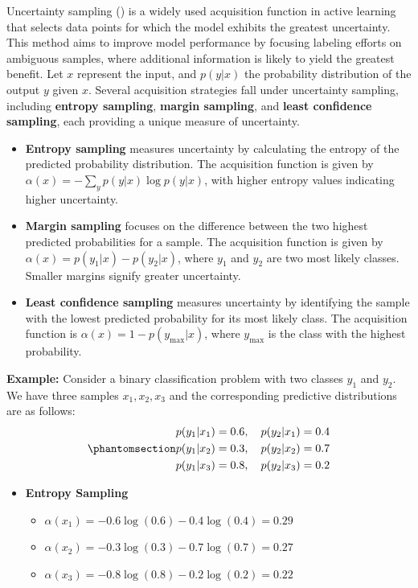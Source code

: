 \documentclass[
  letterpaper,
  numbers=noenddot,
  DIV=11]{scrreprt}
\providecommand{\tightlist}{%
  \setlength{\itemsep}{0pt}\setlength{\parskip}{0pt}}\usepackage{longtable,booktabs,array}
\theoremstyle{definition}
\theoremstyle{plain}
\theoremstyle{plain}
\theoremstyle{remark}
\begin{document}
Uncertainty sampling () is
a widely used acquisition function in active learning that selects data
points for which the model exhibits the greatest uncertainty. This
method aims to improve model performance by focusing labeling efforts on
ambiguous samples, where additional information is likely to yield the
greatest benefit. Let \(x\) represent the input, and \(p(y|x)\) the
probability distribution of the output \(y\) given \(x\). Several
acquisition strategies fall under uncertainty sampling, including
\textbf{entropy sampling}, \textbf{margin sampling}, and \textbf{least
confidence sampling}, each providing a unique measure of uncertainty.

\begin{itemize}
\item
  \textbf{Entropy sampling} measures uncertainty by calculating the
  entropy of the predicted probability distribution. The acquisition
  function is given by \(\alpha(x) = - \sum_{y} p(y|x) \log p(y|x)\),
  with higher entropy values indicating higher uncertainty.
\item
  \textbf{Margin sampling} focuses on the difference between the two
  highest predicted probabilities for a sample. The acquisition function
  is given by \(\alpha(x) = p(y_1|x) - p(y_2|x)\), where \(y_1\) and
  \(y_2\) are two most likely classes. Smaller margins signify greater
  uncertainty.
\item
  \textbf{Least confidence sampling} measures uncertainty by identifying
  the sample with the lowest predicted probability for its most likely
  class. The acquisition function is
  \(\alpha(x) = 1 - p(y_{\text{max}}|x)\), where \(y_{\text{max}}\) is
  the class with the highest probability.
\end{itemize}

\textbf{Example:} Consider a binary classification problem with two
classes \(y_1\) and \(y_2\). We have three samples \(x_1, x_2, x_3\) and
the corresponding predictive distributions are as follows:
\begin{equation}\phantomsection\label{eq-eq3.1}{\begin{aligned}
p(y_1|x_1) &= 0.6, \quad p(y_2|x_1) = 0.4\\
p(y_1|x_2) &= 0.3, \quad p(y_2|x_2) = 0.7\\
p(y_1|x_3) &= 0.8, \quad p(y_2|x_3) = 0.2
\end{aligned}}\end{equation}

\begin{itemize}
\tightlist
\item
  \textbf{Entropy Sampling}

  \begin{itemize}
  \tightlist
  \item
    \(\alpha(x_1) = -0.6 \log (0.6) - 0.4 \log (0.4) = 0.29\)
  \item
    \(\alpha(x_2) = -0.3 \log (0.3) - 0.7 \log (0.7) = 0.27\)
  \item
    \(\alpha(x_3) = -0.8 \log (0.8) - 0.2 \log (0.2) = 0.22\)
  \end{itemize}
\end{itemize}
\end{document}
